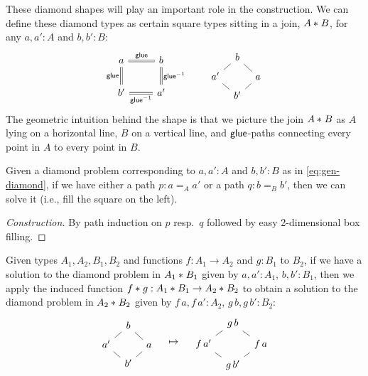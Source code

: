 These diamond shapes will play an important role in the
construction. We can define these diamond types as certain square
types sitting in a join, ${A}\ast_{}{B}$, for any $a,a':A$ and $b,b':B$:
\begin{equation}\label{eq:gen-diamond}
  \begin{tikzcd}[arrows=equals]
    a \arrow{r}{\jglue}\arrow{d}[swap]{\jglue} &
    b \arrow{d}{\rev{\jglue}} \\
    b' \arrow{r}[swap]{\rev{\jglue}} & a'
  \end{tikzcd}
  \qquad
  \begin{tikzcd}[every arrow/.append style={-},row sep=tiny,column sep=tiny]
    & b \arrow{dl}\arrow{dr} & \\
    a' \arrow{dr} & & a\arrow{dl} \\
    & b' &
  \end{tikzcd}
\end{equation}
The geometric intuition behind the shape is that we
picture the join ${A}\ast_{}{B}$ as $A$ lying on a horizontal line, $B$ on
a vertical line, and ${\mathsf{glue}}$-paths connecting every point in $A$ to
every point in $B$.
\begin{defn}\label{defn:vhdiamond}
  Given a diamond problem corresponding to $a,a':A$ and $b,b':B$ as in
  \eqref{eq:gen-diamond}, if we have either a path $p:a=_Aa'$ or a
  path $q:b=_Bb'$, then we can solve it (i.e., fill the square on the
  left).
\end{defn}
\begin{proof}[Construction]
  By path induction on $p$ resp.\ $q$ followed by easy
  2-dimensional box filling.
\end{proof}
\begin{defn}
  Given types $A_1,A_2,B_1,B_2$ and functions $f:A_1\to A_2$ and
  $g:B_1$ to $B_2$, if we have a solution to the diamond problem in
  ${A_1}\ast_{}{B_1}$ given by $a,a':A_1$, $b,b':B_1$, then we apply
  the induced function
  ${f}\ast_{}{g}:{A_1}\ast_{}{B_1}\to {A_2}\ast_{}{B_2}$ to obtain a
  solution to the diamond problem in ${A_2}\ast_{}{B_2}$ given by
  $f\,a,f\,a':A_2$, $g\,b,g\,b':B_2$:
  \begin{equation*}
    \begin{tikzcd}[every arrow/.append style={-},row sep=tiny,column sep=tiny]
      & b \arrow{dl}\arrow{dr} & \\
      a' \arrow{dr} & & a\arrow{dl} \\
      & b' &
    \end{tikzcd}\quad\mapsto\quad
    \begin{tikzcd}[every arrow/.append style={-},row sep=tiny,column sep=tiny]
      & g\,b \arrow{dl}\arrow{dr} & \\
      f\,a' \arrow{dr} & & f\,a\arrow{dl} \\
      & g\,b' &      
    \end{tikzcd}
  \end{equation*}
\end{defn}
